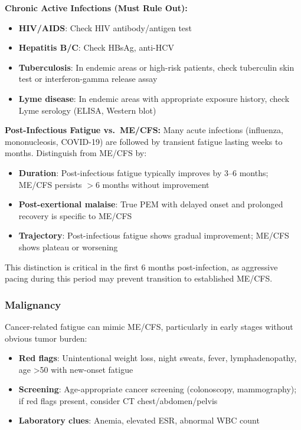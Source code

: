 \textbf{Chronic Active Infections (Must Rule Out):}
\begin{itemize}
    \item \textbf{HIV/AIDS}: Check HIV antibody/antigen test
    \item \textbf{Hepatitis B/C}: Check HBsAg, anti-HCV
    \item \textbf{Tuberculosis}: In endemic areas or high-risk patients, check tuberculin skin test or interferon-gamma release assay
    \item \textbf{Lyme disease}: In endemic areas with appropriate exposure history, check Lyme serology (ELISA, Western blot)
\end{itemize}

\textbf{Post-Infectious Fatigue vs.\ ME/CFS:}
Many acute infections (influenza, mononucleosis, COVID-19) are followed by transient fatigue lasting weeks to months. Distinguish from ME/CFS by:
\begin{itemize}
    \item \textbf{Duration}: Post-infectious fatigue typically improves by 3--6 months; ME/CFS persists $>6$ months without improvement
    \item \textbf{Post-exertional malaise}: True PEM with delayed onset and prolonged recovery is specific to ME/CFS
    \item \textbf{Trajectory}: Post-infectious fatigue shows gradual improvement; ME/CFS shows plateau or worsening
\end{itemize}

This distinction is critical in the first 6 months post-infection, as aggressive pacing during this period may prevent transition to established ME/CFS.

\subsubsection{Malignancy}

\begin{warning}
\label{warn:malignancy-screening}
Cancer-related fatigue can mimic ME/CFS, particularly in early stages without obvious tumor burden:
\begin{itemize}
    \item \textbf{Red flags}: Unintentional weight loss, night sweats, fever, lymphadenopathy, age >50 with new-onset fatigue
    \item \textbf{Screening}: Age-appropriate cancer screening (colonoscopy, mammography); if red flags present, consider CT chest/abdomen/pelvis
    \item \textbf{Laboratory clues}: Anemia, elevated ESR, abnormal WBC count
\end{itemize}
\end{warning}

